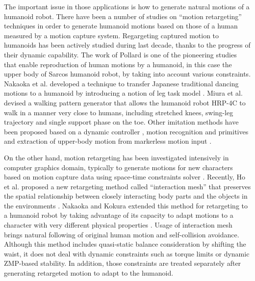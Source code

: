\documentclass[letterpaper, 10 pt, conference]{ieeeconf}  %
\begin{document}
The important issue in those applications is how to generate natural
motions of a humanoid robot. 
There have been a number of studies on ``motion retargeting''
techniques in order to
generate humanoid motions based on those of a human measured by a
motion capture system.
Regargeting captured motion to humanoids has been
actively studied during last decade, thanks to the progress of their
dynamic capability. The work of Pollard \cite{Pollard02ICRA} is one of
the pioneering studies that enable reproduction of human motions
by a humanoid, in this case the upper body of Sarcos humanoid robot,
by taking into account various constraints. 
Nakaoka et al. developed a technique to  transfer
Japanese traditional dancing motions  to a humanoid by introducing a
notion of leg task model \cite{nakaoka_icra2004,nakaoka_2007}.
Miura et al. \cite{Miura11IROS} devised a walking pattern generator
that allows the humanoid robot HRP-4C to walk in a manner very close
to humans, including stretched knees, swing-leg trajectory and single
support phase on the toe.
Other imitation methods have been proposed based on a dynamic
controller  \cite{Yamane11humanoids,Ramos11humanoids}, 
motion recognition and primitives \cite{Ott08humanoids} and
extraction of upper-body motion from markerless motion input
\cite{Dariush08IROS,Do08humanoids}. 



% 


On the other hand, motion retargeting has been investigated
intensively in computer graphics domain, typically to generate motions
for new characters based on motion capture data using space-time
constraints solver \cite{Gleicher98}.  
Recently, Ho et al. proposed a new retargeting method called
``interaction mesh'' 
that preserves the spatial relationship between closely interacting body
parts and the objects in the environments \cite{Komura10}.
Nakaoka and Kokura extended this method for retargeting to a humanoid
robot by taking advantage of its capacity to adapt motions
to a character with very different physical properties
\cite{Nakaoka12Humanoids}. Usage of interaction mesh brings natural
following of original human motion and self-collision avoidance.
Although this method includes quasi-static
balance consideration by shifting the waist, it does not deal with 
dynamic constraints such as torque limits or dynamic ZMP-based
stability. In addition, those constraints are treated separately after
generating retargeted motion to adapt to the humanoid.
\end{document}
